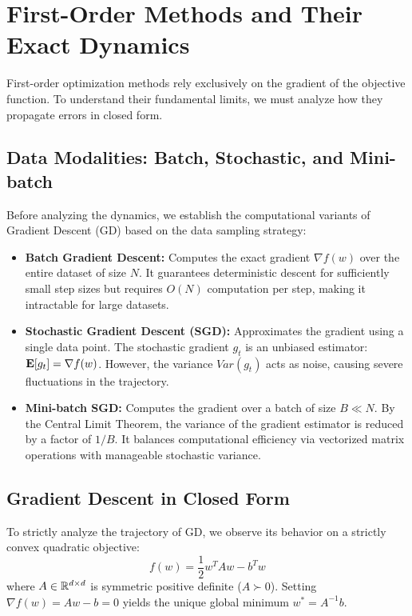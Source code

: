 \section{First-Order Methods and Their Exact Dynamics}
\label{sec:first_order}

First-order optimization methods rely exclusively on the gradient of the objective function. To understand their fundamental limits, we must analyze how they propagate errors in closed form.

\subsection{Data Modalities: Batch, Stochastic, and Mini-batch}
Before analyzing the dynamics, we establish the computational variants of Gradient Descent (GD) based on the data sampling strategy:
\begin{itemize}
    \item \textbf{Batch Gradient Descent:} Computes the exact gradient $\nabla f(w)$ over the entire dataset of size $N$. It guarantees deterministic descent for sufficiently small step sizes but requires $O(N)$ computation per step, making it intractable for large datasets.
    \item \textbf{Stochastic Gradient Descent (SGD):} Approximates the gradient using a single data point. The stochastic gradient $g_t$ is an unbiased estimator: ${\bf E}[g_t] = \nabla f(w)$. However, the variance $Var(g_t)$ acts as noise, causing severe fluctuations in the trajectory.
    \item \textbf{Mini-batch SGD:} Computes the gradient over a batch of size $B \ll N$. By the Central Limit Theorem, the variance of the gradient estimator is reduced by a factor of $1/B$. It balances computational efficiency via vectorized matrix operations with manageable stochastic variance.
\end{itemize}

\subsection{Gradient Descent in Closed Form}
To strictly analyze the trajectory of GD, we observe its behavior on a strictly convex quadratic objective:
\begin{equation}
f(w) = \frac{1}{2} w^T A w - b^T w
\end{equation}
where $A \in \mathbb R^{d \times d}$ is symmetric positive definite ($A \succ 0$). Setting $\nabla f(w) = A w - b = 0$ yields the unique global minimum $w^* = A^{-1}b$.

